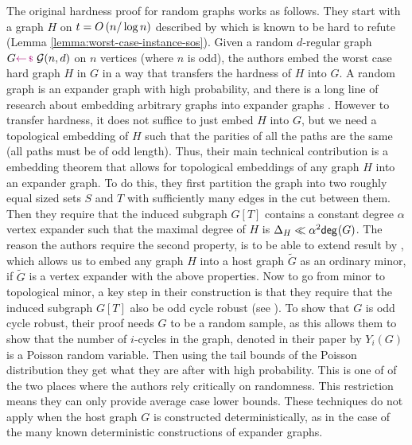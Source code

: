 \documentclass[11pt]{article}
\begin{document}
The original hardness proof for random graphs works as follows.
They start with a graph $H$ on $t = O\left(n/\log n\right)$ described by \citet{buss1999linear} which is known to be hard to refute (Lemma \ref{lemma:worst-case-instance-sos}).
Given a random $d$-regular graph $G\samples \mathcal{G}(n, d)$ on $n$ vertices (where $n$ is odd), the authors embed the worst case hard graph $H$ in $G$ in a way that transfers the hardness of $H$ into $G$.
A random graph is an expander graph with high probability, and there is a long line of research about embedding arbitrary graphs into expander graphs \citep{krivelevich2019completeminorsgraphssparse, kleinberg1996short}.
However to transfer hardness, it does not suffice to just embed $H$ into $G$, but we need a topological embedding of $H$ such that the parities of all the paths are the same (all paths must be of odd length).
Thus, their main technical contribution is a embedding theorem that allows for  topological embeddings of any graph $H$ into an expander graph.
To do this, they first partition the graph into two roughly equal sized sets $S$ and $T$ with sufficiently many edges in the cut between them.
Then they require that the induced subgraph $G[T]$ contains a constant degree $\alpha$ vertex expander such that the maximal degree of $H$ is $\Delta_{H} \ll \alpha^2 \mathsf{deg}_{}(G)$.
The reason the authors require the second property, is to be able to extend result by \citet{krivelevich2019completeminorsgraphssparse}, which allows us to embed any graph $H$ into a host graph $\tilde{G}$ as an ordinary minor, if $\tilde{G}$ is a vertex expander with the above properties.
Now to go from minor to topological minor, a key step in their construction is that they require that the induced subgraph $G[T]$ also be odd cycle robust (see \citep[Definition 3.2]{Austrin_2022}).
To show that $G$ is odd cycle robust, their proof needs $G$ to be a random sample, as this allows them to show that the number of $i$-cycles in the graph, denoted in their paper by $Y_i(G)$ is a Poisson random variable.
Then using the tail bounds of the Poisson distribution they get what they are after with high probability.
This is one of of the two places where the authors rely critically on randomness.
This restriction means they can only provide average case lower bounds.
These techniques do not apply when the host graph $G$ is constructed deterministically, as in the case of the many known deterministic constructions of expander graphs.\par
\end{document}
